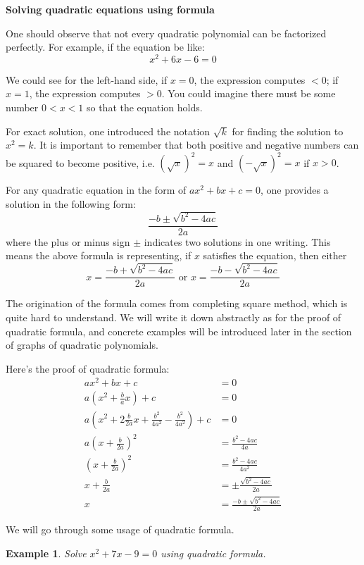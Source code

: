 \documentclass[12pt]{article}
\newtheorem{example}{Example}
\begin{document}
    \begin{center}
        \textbf{Solving quadratic equations using formula}
    \end{center}

    One should observe that not every quadratic polynomial can be factorized perfectly. For example, if the equation be like:$$x^2+6x-6=0$$

    We could see for the left-hand side, if $x=0$, the expression computes $<0$; if $x=1$, the expression computes $>0$. You could imagine there must be some number $0<x<1$ so that the equation holds.
    
    For exact solution, one introduced the notation $\sqrt{k}$ for finding the solution to $x^2=k$. It is important to remember that both positive and negative numbers can be squared to become positive, i.e. $(\sqrt{x})^2=x$ and $(-\sqrt{x})^2=x$ if $x>0$.

    For any quadratic equation in the form of $ax^2+bx+c=0$, one provides a solution in the following form:$$\frac{-b\pm\sqrt{b^2-4ac}}{2a}$$where the plus or minus sign $\pm$ indicates two solutions in one writing. This means the above formula is representing, if $x$ satisfies the equation, then either $$x=\frac{-b+\sqrt{b^2-4ac}}{2a}\textrm{ or }x=\frac{-b-\sqrt{b^2-4ac}}{2a}$$ 
    
    The origination of the formula comes from completing square method, which is quite hard to understand. We will write it down abstractly as for the proof of quadratic formula, and concrete examples will be introduced later in the section of graphs of quadratic polynomials.

    Here's the proof of quadratic formula:\begin{align*}
        ax^2+bx+c&=0\\
        a(x^2+\frac{b}{a}x)+c&=0\\
        a(x^2+2\frac{b}{2a}x+\frac{b^2}{4a^2}-\frac{b^2}{4a^2})+c&=0\\
        a(x+\frac{b}{2a})^2&=\frac{b^2-4ac}{4a}\\
        (x+\frac{b}{2a})^2&=\frac{b^2-4ac}{4a^2}\\
        x+\frac{b}{2a}&=\pm\frac{\sqrt{b^2-4ac}}{2a}\\
        x&=\frac{-b\pm\sqrt{b^2-4ac}}{2a}
    \end{align*}

    We will go through some usage of quadratic formula.

    \begin{example}
        Solve $x^2+7x-9=0$ using quadratic formula.
    \end{example}
\end{document}
